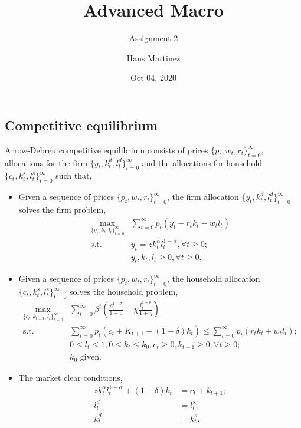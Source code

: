 \documentclass[]{article}
\title{Advanced Macro}
\subtitle{Assignment 2}
\author{Hans Martinez}
\date{Oct 04, 2020}
\begin{document}
\maketitle

\hypertarget{competitive-equilibrium}{%
\subsection{Competitive equilibrium}\label{competitive-equilibrium}}

Arrow-Debreu competitive equilibrium consists of prices
\(\{p_t,w_t,r_t\}_{t=0}^{\infty}\), allocations for the firm
\(\{y_t,k_t^d,l_t^d\}_{t=0}^{\infty}\) and the allocations for household
\(\{c_t,k_t^s,l_t^s\}_{t=0}^{\infty}\) such that,

\begin{itemize}
\item
  Given a sequence of prices \(\{p_t,w_t,r_t\}_{t=0}^{\infty}\), the
  firm allocation \(\{y_t,k_t^d,l_t^d\}_{t=0}^{\infty}\) solves the firm
  problem, \begin{equation}
            \begin{split}
                \max_{\{y_t,k_t,l_t\}_{t=0}^{\infty}}&\sum_{t=0}^{\infty}
                p_t(y_t-r_tk_t-w_tl_t)\\
                \text{s.t.  }&y_t=zk_t^{\alpha}l_t^{1-\alpha}, \forall t\geq 0;\\
                &y_t,k_t,l_t\geq 0, \forall t \geq 0.
            \end{split}
            \end{equation}
\item
  Given a sequence of prices \(\{p_t,w_t,r_t\}_{t=0}^{\infty}\), the
  household allocation \(\{c_t,k_t^s,l_t^s\}_{t=0}^{\infty}\) solves the
  household problem, \begin{equation}
            \begin{split}
                \max_{\{c_t,k_{t+1},l_t\}_{t=0}^{\infty}}&\sum_{t=0}^{\infty}
                \beta ^t(\frac{c_t^{1-\sigma}}{1-\sigma}-\chi \frac{l_t^{1+\eta}}{1+\eta})\\
                \text{s.t.  }& \sum_{t=0}^{\infty}p_t(c_t+K_{t+1}-(1-\delta)k_t)
                \leq\sum_{t=0}^{\infty}p_t(r_tk_t+w_tl_t);\\
                &0\leq l_t\leq 1,0\leq k_t\leq k_0, c_t\geq 0, k_{t+1}\geq 0,\forall t \geq 0;\\
                &k_0 \text{ given.}
            \end{split}
            \end{equation}
\item
  The market clear conditions, \begin{equation*}
            \begin{split}
                zk_t^{\alpha}l_t^{1-\alpha}+(1-\delta)k_t&=c_t+k_{t+1} ;\\
                l_t^d&=l_t^s    ;\\
                k_t^d&=k_t^s    .
            \end{split}
            \end{equation*}
\end{itemize}
\end{document}
